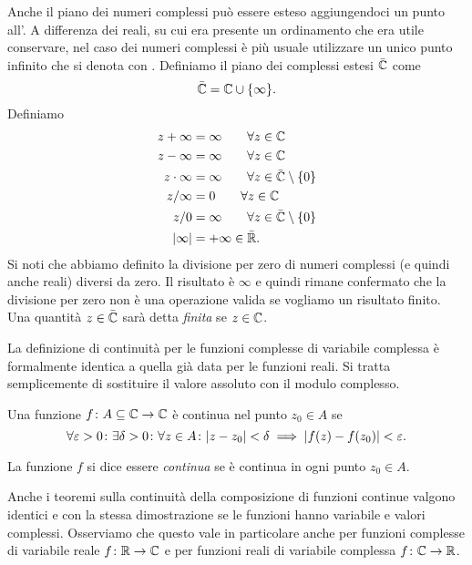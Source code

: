 Anche il piano dei numeri complessi può essere esteso aggiungendoci
un punto all'.
A differenza dei reali, su cui era presente un ordinamento che era utile conservare,
nel caso dei numeri complessi è più usuale utilizzare un unico punto infinito
che si denota con \myemph{$\infty$}.
Definiamo il piano dei complessi estesi $\bar {\mathbb C}$ come
\[
\bar {\mathbb C} = \mathbb C \cup {\left\{ \infty \right\}}.
\]
Definiamo
\begin{align*}
  z + \infty &= \infty \qquad \forall z \in \mathbb C\\
  z - \infty &= \infty \qquad \forall z \in \mathbb C\\
   z\cdot \infty &= \infty \qquad \forall z \in \bar{\mathbb C}\setminus{\left\{ 0 \right\}} \\
   z / \infty &= 0 \qquad \forall z \in \mathbb C \\
   z / 0 &= \infty \qquad \forall z \in \bar {\mathbb C} \setminus{\left\{ 0 \right\}}\\
   {\left|\infty\right|} &= +\infty \in \bar {\mathbb R}.
\end{align*}
Si noti che abbiamo definito la divisione per zero di numeri complessi
(e quindi anche reali) diversi da zero. Il risultato è $\infty$ e quindi
rimane confermato che la divisione per zero non è una operazione valida
se vogliamo un risultato finito.
Una quantità $z\in \bar {\mathbb C}$ sarà detta \emph{finita} se $z\in \mathbb C$.

La definizione di continuità per le funzioni complesse di variabile complessa
è formalmente identica a quella già data per le funzioni reali.
Si tratta semplicemente di sostituire il valore assoluto con il modulo complesso.
%
\begin{definition}[continuità in $\CC$]
Una funzione $f\colon A \subseteq \mathbb C \to \mathbb C$ è
continua nel punto $z_0\in A$ se
\[
\forall \varepsilon>0\colon \exists \delta>0 \colon \forall z\in A\colon
{\left|z-z_0\right|}<\delta \implies {\left|f(z)-f(z_0)\right|} < \varepsilon.
\]

La funzione $f$ si dice essere \emph{continua} se
è continua in ogni punto $z_0\in A$.
\end{definition}

Anche i teoremi sulla continuità della composizione di funzioni
continue valgono identici e con la stessa dimostrazione
se le funzioni hanno variabile e valori complessi.
Osserviamo che questo vale
in particolare anche per funzioni complesse di variabile reale
$f\colon \mathbb R\to \mathbb C$ e per funzioni reali di variabile complessa
$f\colon \mathbb C \to \mathbb R$.


